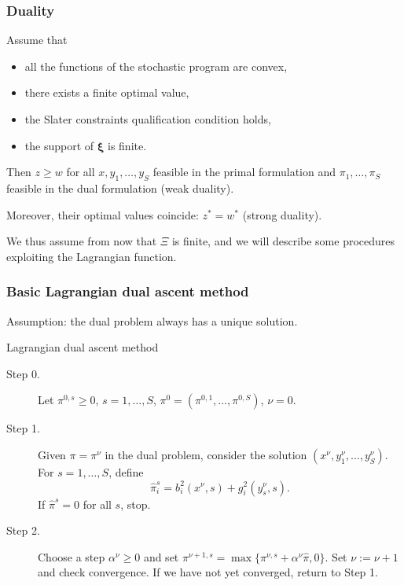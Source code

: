 \documentclass{beamer}
\def\bxi{\boldsymbol\xi}
\begin{document}
\begin{frame}
\frametitle{Duality}

\begin{theorem}
Assume that
\begin{itemize}
\item
all the functions of the stochastic program are convex,
\item
there exists a finite optimal value,
\item
the Slater constraints qualification condition holds,
\item
the support of $\bxi$ is finite.
\end{itemize}

Then $z \geq w$ for all $x, y_1,\ldots{},y_S$ feasible in the primal formulation and $\pi_1,\ldots{},\pi_S$ feasible in the dual formulation (weak duality).

\mbox{}

Moreover, their optimal values coincide: $z^* = w^*$ (strong duality).
\end{theorem}

\mbox{}

We thus assume from now that {\red $\Xi$ is finite}, and we will describe some procedures exploiting the Lagrangian function.

\end{frame}

\begin{frame}
\frametitle{Basic Lagrangian dual ascent method}

Assumption: the dual problem always has a unique solution.

\begin{algo}{Lagrangian dual ascent method}
\begin{description}
\item[Step 0.] Let $\pi^{0,s} \geq 0$, $s = 1,\ldots,S$, $\pi^0 = (\pi^{0,1},\ldots,\pi^{0,S})$, $\nu = 0$.
\item[Step 1.]
Given $\pi = \pi^{\nu}$ in the dual problem, consider the solution
$(x^{\nu}, y_1^{\nu},\ldots{},y_S^{\nu})$.
For $s = 1, \ldots{}, S$, define
$$
\hat{\pi}_i^s = b_i^2(x^{\nu},s)+g_i^2(y_s^{\nu},s).
$$
If $\hat{\pi}^s = 0$ for all $s$, stop.
\item[Step 2.]
Choose a step $\alpha^{\nu} \geq 0$ and set
$
\pi^{\nu+1,s} = \max\{\pi^{\nu,s} + \alpha^{\nu}\hat{\pi}, 0\}.
$
Set $\nu := \nu+1$ and check convergence. If we have not yet converged, return to Step 1.
\end{description}
\end{algo}

\end{frame}
\end{document}
